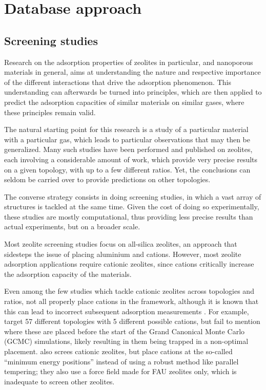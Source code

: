 \documentclass[main.tex]{subfiles}
\begin{document}
\chapter{Database approach}\label{database}
\clearpage

\section{Screening studies}

Research on the adsorption properties of zeolites in particular, and nanoporous materials in general, aims at understanding the nature and respective importance of the different interactions that drive the adsorption phenomenon. This understanding can afterwards be turned into principles, which are then applied to predict the adsorption capacities of similar materials on similar gases, where these principles remain valid.

The natural starting point for this research is a study of a particular material with a particular gas, which leads to particular observations that may then be generalized. Many such studies have been performed and published on zeolites, each involving a considerable amount of work, which provide very precise results on a given topology, with up to a few different \SiAl ratios. Yet, the conclusions can seldom be carried over to provide predictions on other topologies.

The converse strategy consists in doing screening studies, in which a vast array of structures is tackled at the same time. Given the cost of doing so experimentally, these studies are mostly computational, thus providing less precise results than actual experiments, but on a broader scale.

Most zeolite screening studies focus on all-silica zeolites, an approach that sidesteps the issue of placing aluminium and cations. However, most zeolite adsorption applications require cationic zeolites, since cations critically increase the adsorption capacity of the materials.

Even among the few studies which tackle cationic zeolites across topologies and \SiAl ratios, not all properly place cations in the framework, although it is known that this can lead to incorrect subsequent adsorption measurements \autocite{Fang2016}. For example, \textcite{Mousavi2023} target 57 different topologies with 5 different possible cations, but fail to mention where these are placed before the start of the Grand Canonical Monte Carlo (GCMC) simulations, likely resulting in them being trapped in a non-optimal placement. \Textcite{SmitNature2012} also screes cationic zeolites, but place cations at the so-called ``minimum energy positions'' instead of using a robust method like parallel tempering; they also use a force field made for FAU zeolites only, which is inadequate to screen other zeolites.
\end{document}
